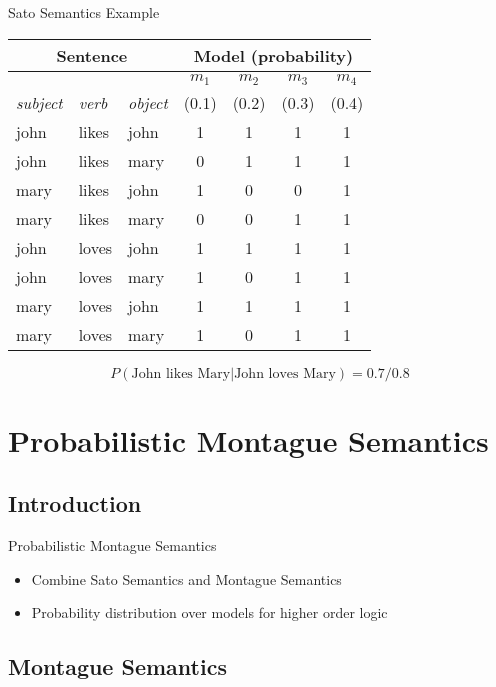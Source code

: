 \documentclass{beamer}
\newlength{\wideitemsep}
\let\olditem\item
\renewcommand{\item}{\setlength{\itemsep}{\wideitemsep}\olditem}
\begin{document}
\begin{frame}{Sato Semantics Example}
\begin{center}
\begin{tabular}{|l|l|l||c|c|c|c|}
\hline
\multicolumn{3}{|c||}{Sentence} & \multicolumn{4}{c|}{Model (probability)}\\
\hline
& & & $m_1$& $m_2$& $m_3$& $m_4$\\
\emph{subject} & \emph{verb} & \emph{object} & (0.1)& (0.2)& (0.3)& (0.4)\\
\hline
john & likes & john & 1 & 1 & 1 & 1\\
john & likes & mary & 0 & 1 & 1 & 1\\
mary & likes & john & 1 & 0 & 0 & 1\\
mary & likes & mary & 0 & 0 & 1 & 1\\
john & loves & john & 1 & 1 & 1 & 1\\
john & loves & mary & 1 & 0 & 1 & 1\\
mary & loves & john & 1 & 1 & 1 & 1\\
mary & loves & mary & 1 & 0 & 1 & 1\\
\hline
\end{tabular}
\end{center}
$$P(\text{John likes Mary}|\text{John loves Mary}) = 0.7/0.8 $$
\end{frame}

\section{Probabilistic Montague Semantics}

\subsection{Introduction}

\begin{frame}{Probabilistic Montague Semantics}
\begin{itemize}
\item Combine Sato Semantics and Montague Semantics
\item Probability distribution over models for higher order logic
\end{itemize}
\end{frame}

\subsection{Montague Semantics}
\end{document}
